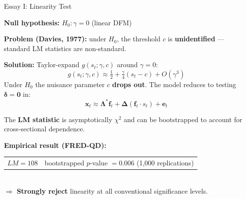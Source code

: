 \documentclass{beamer}
\begin{document}
\begin{frame}{Essay I: Linearity Test}

\textbf{Null hypothesis:} $H_0: \gamma=0$ (linear DFM)

\vspace{0.3em}
\textbf{Problem (Davies, 1977):} under $H_0$, the threshold $c$ is \textbf{unidentified} --- standard LM statistics are non-standard.

\vspace{0.4em}
\textbf{Solution:} Taylor-expand $g(s_t;\gamma,c)$ around $\gamma=0$:
\[
g(s_t;\gamma,c) \approx \tfrac{1}{2} + \tfrac{\gamma}{4}(s_t-c) + O(\gamma^3)
\]
Under $H_0$ the nuisance parameter $c$ \textbf{drops out}. The model reduces to testing $\boldsymbol{\delta}=\boldsymbol{0}$ in:
\[
\boldsymbol{x}_t \approx \boldsymbol{\Lambda}^*\boldsymbol{f}_t + \boldsymbol{\Delta}(\boldsymbol{f}_t \cdot s_t) + \boldsymbol{e}_t
\]

The \textbf{LM statistic} is asymptotically $\chi^2$ and can be bootstrapped to account for cross-sectional dependence.

\vspace{0.5em}
\textbf{Empirical result (FRED-QD):}\\[3pt]
\begin{tabular}{ll}
$LM = 108$ & bootstrapped $p$-value $= 0.006$ (1{,}000 replications)
\end{tabular}\\[3pt]
$\Rightarrow$ \textbf{Strongly reject} linearity at all conventional significance levels.

\end{frame}
\end{document}
